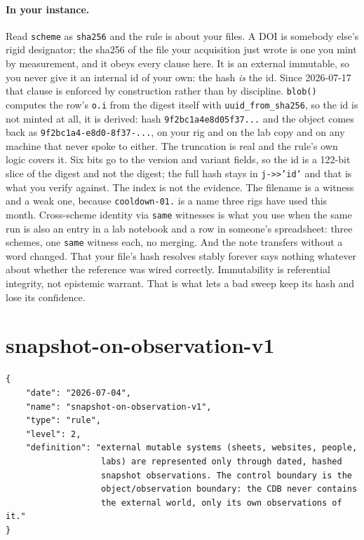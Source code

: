 \paragraph{In your instance.} Read \texttt{scheme} as \texttt{sha256} and the rule is about your files. A DOI is somebody else's rigid designator; the sha256 of the \labFileFormat{} file your \labDAQ{} acquisition just wrote is one you mint by measurement, and it obeys every clause here. It is an external immutable, so you never give it an internal id of your own: the hash \emph{is} the id. Since 2026-07-17 that clause is enforced by construction rather than by discipline. \texttt{blob()} computes the row's \texttt{o.i} from the digest itself with \texttt{uuid\_from\_sha256}, so the id is not minted at all, it is derived: hash \texttt{9f2bc1a4e8d05f37...} and the object comes back as \texttt{9f2bc1a4-e8d0-8f37-...}, on your rig and on the lab copy and on any machine that never spoke to either. The truncation is real and the rule's own logic covers it. Six bits go to the version and variant fields, so the id is a 122-bit slice of the digest and not the digest; the full hash stays in \texttt{j->>'id'} and that is what you verify against. The index is not the evidence. The filename is a witness and a weak one, because \texttt{cooldown-01.\labFileExt} is a name three rigs have used this month. Cross-scheme identity via \texttt{same} witnesses is what you use when the same run is also an entry in a lab notebook and a row in someone's spreadsheet: three schemes, one \texttt{same} witness each, no merging. And the note transfers without a word changed. That your file's hash resolves stably forever says nothing whatever about whether the \labLockin{} reference was wired correctly. Immutability is referential integrity, not epistemic warrant. That is what lets a bad sweep keep its hash and lose its confidence.

\section{snapshot-on-observation-v1}

\begin{lstlisting}[language={},basicstyle=\ttfamily\footnotesize]
{
    "date": "2026-07-04",
    "name": "snapshot-on-observation-v1",
    "type": "rule",
    "level": 2,
    "definition": "external mutable systems (sheets, websites, people,
                   labs) are represented only through dated, hashed
                   snapshot observations. The control boundary is the
                   object/observation boundary: the CDB never contains
                   the external world, only its own observations of it."
}
\end{lstlisting}

